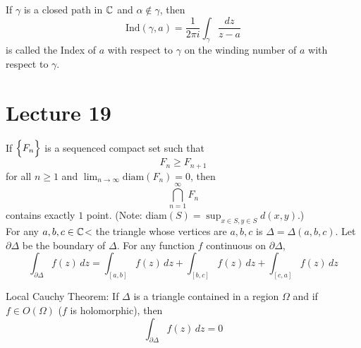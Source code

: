 \documentclass[12pt]{article}
\begin{document}
If $\gamma$ is a closed path in $\mathbb{C}$ and $\alpha \not\in \gamma$, then $$\text{Ind}(\gamma, a) = \frac{1}{2\pi i} \int_\gamma \frac{dz}{z-a} $$ is called the Index of $a$ with respect to $\gamma$ on the winding number of $a$ with respect to $\gamma$. 

\section{Lecture 19} 
If $\Big\{ F_n \Big\}$ is a sequenced compact set such that $$ F_n \geq F_{n+1} $$ for all $n \geq 1$ and $\lim_{n\to\infty} \text{diam}(F_n) = 0$, then $$\bigcap_{n=1}^\infty F_n$$ contains exactly $1$ point. (Note: diam$(S) = \sup_{x\in S, y\in S} d(x,y)$.)\\
For any $a,b,c \in \mathbb{C}$< the triangle whose vertices are $a,b,c$ is $\Delta = \Delta(a,b,c)$. Let $\partial \Delta$ be the boundary of $\Delta$. For any function $f$ continuous on $\partial \Delta$, $$ \int_{\partial \Delta} f(z) \, dz = \int_{[a,b]} f(z) \, dz + \int_{[b,c]} f(z) \, dz + \int_{[c,a]} f(z) \, dz $$ 
\begin{theorem} Local Cauchy Theorem: If $\Delta$ is a triangle contained in a region $\Omega$ and if $f \in O(\Omega)$ ($f$ is holomorphic), then $$ \int_{\partial \Delta} f(z) \, dz = 0 $$ \end{theorem} 
\end{document}
